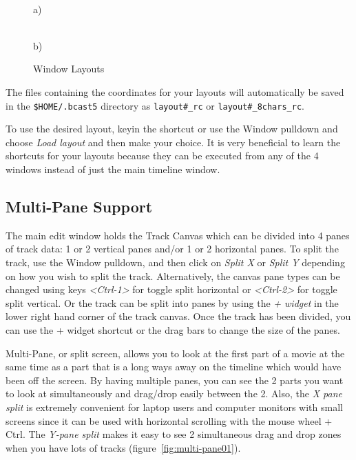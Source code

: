 \begin{figure}[htpb]
    \centering
    \begin{minipage}{.49\linewidth}
        \\ a)
    \end{minipage}
    \begin{minipage}{.49\linewidth}
        \vspace{13ex}
        \\ b)
    \end{minipage}
    \caption{Window Layouts}
    \label{fig:window_layouts}
\end{figure}

The files containing the coordinates for your layouts will automatically be saved in the \texttt{\$HOME/.bcast5} directory as \texttt{layout\#\_rc} or \texttt{layout\#\_8chars\_rc}.

To use the desired layout, keyin the shortcut or use the Window pulldown and choose \emph{Load layout} and then make your choice. It is very beneficial to learn the shortcuts for your
layouts because they can be executed from any of the 4 windows instead of just the main
timeline window.

\subsection{Multi-Pane Support}%
\label{sub:multipane_support}

The main \CGG{} edit window holds the Track Canvas which can be divided into 4 panes of track data: 1 or 2 vertical panes and/or 1 or 2 horizontal panes.  To split the track, use the Window pulldown, and then click on \textit{Split X} or \textit{Split Y} depending on how you wish to split the track.  Alternatively, the canvas pane types can be changed using keys \textit{<Ctrl-1>} for toggle split horizontal or \textit{<Ctrl-2>} for toggle split vertical.  Or the track can be split into panes by using the \textit{+ widget} in the lower right hand corner of the track canvas.  Once the track has been divided, you can use the + widget shortcut or the drag bars to change the size of the panes.

Multi-Pane, or split screen, allows you to look at the first part of a movie at the same time as a part that is a long ways away on the timeline which would have been off the screen.  By having multiple panes, you can see the 2 parts you want to look at simultaneously and drag/drop easily between the 2.  Also, the \textit{X pane split} is extremely convenient for laptop users and computer monitors with small screens since it can be used with horizontal scrolling with the mouse wheel + Ctrl.  The \textit{Y-pane split} makes it easy to see 2 simultaneous drag and drop zones when you have lots of tracks (figure~\ref{fig:multi-pane01}).

